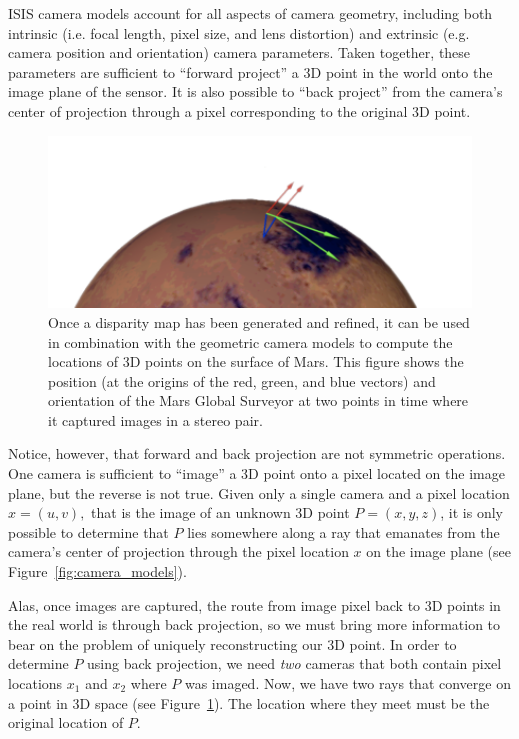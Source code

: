 \ac{ISIS} camera models account for all aspects of camera geometry,
including both intrinsic (i.e. focal length, pixel size, and lens
distortion) and extrinsic (e.g. camera position and orientation)
camera parameters.  Taken together, these parameters are sufficient to
``forward project'' a 3D point in the world onto the image plane of
the sensor.  It is also possible to ``back project'' from the camera's
center of projection through a pixel corresponding to the original 3D
point.

\begin{figure}[tb]
  \centering
  \includegraphics[width=12cm]{images/correlation/triangulation_400px.png}
  \caption{Once a disparity map has been generated and refined, it can
    be used in combination with the geometric camera models to compute
    the locations of 3D points on the surface of Mars.  This figure
    shows the position (at the origins of the red, green, and blue vectors) and
	orientation of the Mars Global Surveyor at
    two points in time where it captured images in a stereo pair.}
  \label{fig:triangulation}
\end{figure}

Notice, however, that forward and back projection are not symmetric
operations.  One camera is sufficient to ``image'' a 3D point onto a
pixel located on the image plane, but the reverse is not true.  Given
only a single camera and a pixel location $x = (u,v),$ that is the
image of an unknown 3D point $P = (x,y,z)$, it is only possible to
determine that $P$ lies somewhere along a ray that emanates from the
camera's center of projection through the pixel location $x$ on the
image plane (see Figure~\ref{fig:camera_models}).

Alas, once images are captured, the route from image pixel back to 3D
points in the real world is through back projection, so we must bring
more information to bear on the problem of uniquely reconstructing our
3D point.  In order to determine $P$ using back projection, we need
{\em two} cameras that both contain pixel locations $x_1$ and $x_2$
where $P$ was imaged.  Now, we have two rays that converge on a point
in 3D space (see Figure~\ref{fig:triangulation}). The location where
they meet must be the original location of $P$.

